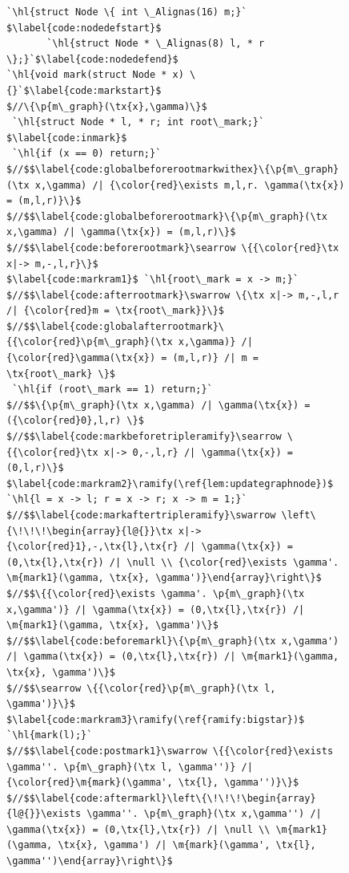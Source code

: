 \documentclass[acmsmall,screen]{acmart}
\newcommand{\tx}[1]{\text{#1}}
\newcommand{\p}[1]{\ensuremath{\mathsf{#1}}} \newcommand{\m}[1]{\ensuremath{\mathit{#1}}} \newcommand{\ma}[1]{\ensuremath{\mathcal{#1}}} \let\ramify\lightning
\newcommand{\hl}[1]{\colorbox{lightgray}{#1}}
\begin{document}
\begin{figure}[t]
\begin{lstlisting}[multicols=2]
`\hl{struct Node \{ int \_Alignas(16) m;}` $\label{code:nodedefstart}$
       `\hl{struct Node * \_Alignas(8) l, * r \};}`$\label{code:nodedefend}$
`\hl{void mark(struct Node * x) \{}`$\label{code:markstart}$
$//\{\p{m\_graph}(\tx{x},\gamma)\}$
 `\hl{struct Node * l, * r; int root\_mark;}` $\label{code:inmark}$
 `\hl{if (x == 0) return;}`
$//$$\label{code:globalbeforerootmarkwithex}\{\p{m\_graph}(\tx x,\gamma) /| {\color{red}\exists m,l,r. \gamma(\tx{x}) = (m,l,r)}\}$
$//$$\label{code:globalbeforerootmark}\{\p{m\_graph}(\tx x,\gamma) /| \gamma(\tx{x}) = (m,l,r)\}$
$//$$\label{code:beforerootmark}\searrow \{{\color{red}\tx x|-> m,-,l,r}\}$
$\label{code:markram1}$ `\hl{root\_mark = x -> m;}`
$//$$\label{code:afterrootmark}\swarrow \{\tx x|-> m,-,l,r /| {\color{red}m = \tx{root\_mark}}\}$
$//$$\label{code:globalafterrootmark}\{{\color{red}\p{m\_graph}(\tx x,\gamma)} /| {\color{red}\gamma(\tx{x}) = (m,l,r)} /| m = \tx{root\_mark} \}$
 `\hl{if (root\_mark == 1) return;}`
$//$$\{\p{m\_graph}(\tx x,\gamma) /| \gamma(\tx{x}) = ({\color{red}0},l,r) \}$
$//$$\label{code:markbeforetripleramify}\searrow \{{\color{red}\tx x|-> 0,-,l,r} /| \gamma(\tx{x}) = (0,l,r)\}$
$\label{code:markram2}\ramify(\ref{lem:updategraphnode})$ `\hl{l = x -> l; r = x -> r; x -> m = 1;}`
$//$$\label{code:markaftertripleramify}\swarrow \left\{\!\!\!\begin{array}{l@{}}\tx x|-> {\color{red}1},-,\tx{l},\tx{r} /| \gamma(\tx{x}) = (0,\tx{l},\tx{r}) /| \null \\ {\color{red}\exists \gamma'. \m{mark1}(\gamma, \tx{x}, \gamma')}\end{array}\right\}$
$//$$\{{\color{red}\exists \gamma'. \p{m\_graph}(\tx x,\gamma')} /| \gamma(\tx{x}) = (0,\tx{l},\tx{r}) /| \m{mark1}(\gamma, \tx{x}, \gamma')\}$
$//$$\label{code:beforemarkl}\{\p{m\_graph}(\tx x,\gamma') /| \gamma(\tx{x}) = (0,\tx{l},\tx{r}) /| \m{mark1}(\gamma, \tx{x}, \gamma')\}$
$//$$\searrow \{{\color{red}\p{m\_graph}(\tx l, \gamma')}\}$
$\label{code:markram3}\ramify(\ref{ramify:bigstar})$ `\hl{mark(l);}`
$//$$\label{code:postmark1}\swarrow \{{\color{red}\exists \gamma''. \p{m\_graph}(\tx l, \gamma'')} /| {\color{red}\m{mark}(\gamma', \tx{l}, \gamma'')}\}$
$//$$\label{code:aftermarkl}\left\{\!\!\!\begin{array}{l@{}}\exists \gamma''. \p{m\_graph}(\tx x,\gamma'') /| \gamma(\tx{x}) = (0,\tx{l},\tx{r}) /| \null \\ \m{mark1}(\gamma, \tx{x}, \gamma') /| \m{mark}(\gamma', \tx{l}, \gamma'')\end{array}\right\}$

\end{lstlisting}
\end{figure}
\end{document}

